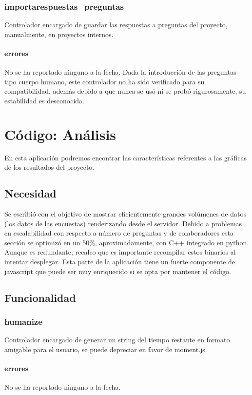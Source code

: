 \documentclass[10pt,a4paper]{book}
\begin{document}
	\subsection{importarespuestas\_preguntas}
	Controlador encargado de guardar las respuestas a preguntas del proyecto, manualmente, en proyectos internos.
	\subsubsection{errores}
	No se ha reportado ninguno a la fecha. Dada la introducción de las preguntas tipo cuerpo humano, este controlador no ha sido verificado para su compatibilidad, además debido a que nunca se usó ni se probó rigurosamente, su estabilidad es desconocida.
	
	
	\chapter{Código: Análisis}
	
	En esta aplicación podremos encontrar las características referentes a las gráficas de los resultados del proyecto.
	
	\section{Necesidad}
	
	Se escribió con el objetivo de mostrar eficientemente grandes volúmenes de datos (los datos de las encuestas) renderizando desde el servidor. Debido a problemas en escalabilidad con respecto a número de preguntas y de colaboradores esta sección se optimizó en un 50\%, aproximadamente, con C++ integrado en python. Aunque es redundante, recalco que es importante recompilar estos binarios al intentar desplegar. Esta parte de la aplicación tiene un fuerte componente de javascript que puede ser muy enriquecido si se opta por mantener el código.
	
	\section{Funcionalidad}
		

	\subsection{humanize}
	Controlador encargado de generar un string del tiempo restante en formato amigable para el usuario, se puede depreciar en favor de moment.js
	\subsubsection{errores}
	No se ha reportado ninguno a la fecha.
	
\end{document}
